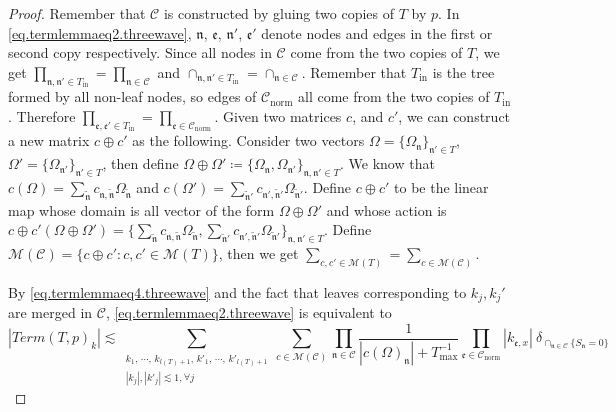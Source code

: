 \begin{proof}
Remember that $\mathcal{C}$ is constructed by gluing two copies of $T$ by $p$. In \eqref{eq.termlemmaeq2.threewave}, $\mathfrak{n}$, $\mathfrak{e}$, $\mathfrak{n}'$, $\mathfrak{e}'$ denote nodes and edges in the first or second copy respectively. Since all nodes in $\mathcal{C}$ come from the two copies of $T$, we get $\prod_{\mathfrak{n}, \mathfrak{n}'\in T_{\text{in}}}=\prod_{\mathfrak{n}\in \mathcal{C}}$ and $\cap_{\mathfrak{n},\mathfrak{n}'\in T_{\text{in}}}=\cap_{\mathfrak{n}\in \mathcal{C}}$. Remember that $T_{\text{in}}$ is the tree formed by all non-leaf nodes, so edges of $\mathcal{C}_{\text{norm}}$ all come from the two copies of $T_{\text{in}}$. Therefore $\prod_{\mathfrak{e},\mathfrak{e}'\in T_{\text{in}}}=\prod_{\mathfrak{e}\in \mathcal{C}_{\text{norm}}}$. Given two matrices $c$, and $c'$, we can construct a new matrix $c\oplus c'$ as the following. Consider two vectors $\Omega=\{\Omega_{\mathfrak{n}}\}_{\mathfrak{n}'\in T}$, $\Omega'=\{\Omega_{\mathfrak{n}'}\}_{\mathfrak{n}'\in T}$, then define $\Omega\oplus\Omega'\coloneqq \{\Omega_{\mathfrak{n}},\Omega_{\mathfrak{n}'}\}_{\mathfrak{n},\mathfrak{n}'\in T}$. We know that $c(\Omega)=\sum_{\widetilde{\mathfrak{n}}}c_{\mathfrak{n},\widetilde{\mathfrak{n}}}\Omega_{\widetilde{\mathfrak{n}}}$ and $c(\Omega')=\sum_{\widetilde{\mathfrak{n}}'}c_{\mathfrak{n}',\widetilde{\mathfrak{n}}'}\Omega_{\widetilde{\mathfrak{n}}'}$. Define $c\oplus c'$ to be the linear map whose domain is all vector of the form $\Omega\oplus\Omega'$ and whose action is $c\oplus c'(\Omega\oplus\Omega')=\{\sum_{\widetilde{\mathfrak{n}}}c_{\mathfrak{n},\widetilde{\mathfrak{n}}}\Omega_{\widetilde{\mathfrak{n}}},\sum_{\widetilde{\mathfrak{n}}'}c_{\mathfrak{n}',\widetilde{\mathfrak{n}}'}\Omega_{\widetilde{\mathfrak{n}}'}\}_{\mathfrak{n},\mathfrak{n}'\in T}$. Define $\mathscr{M}(\mathcal{C})=\{c\oplus c':c, c'\in \mathscr{M}(T)\}$, then we get $\sum_{c, c'\in \mathscr{M}(T) }=\sum_{c\in \mathscr{M}(\mathcal{C}) }$.



By \eqref{eq.termlemmaeq4.threewave} and the fact that leaves corresponding to $k_j, k_j'$ are merged in $\mathcal{C}$, \eqref{eq.termlemmaeq2.threewave} is equivalent to 
\begin{equation}\label{eq.termlemmaeq5.threewave}
|Term(T, p)_k|\lesssim \sum_{\substack{k_1,\, \cdots,\, k_{l(T)+1},\, k'_1,\, \cdots,\, k'_{l(T)+1}\\ |k_{j}|, |k'_j|\lesssim 1, \forall j}} \sum_{c\in \mathscr{M}(\mathcal{C}) }\prod_{\mathfrak{n}\in \mathcal{C}}\frac{1}{|c(\Omega)_{\mathfrak{n}}|+T^{-1}_{\text{max}}} \prod_{\mathfrak{e}\in \mathcal{C}_{\text{norm}}}|k_{\mathfrak{e},x}|\ \delta_{\cap_{\mathfrak{n}\in \mathcal{C}} \{S_{\mathfrak{n}}=0\}}
\end{equation}



\end{proof}
